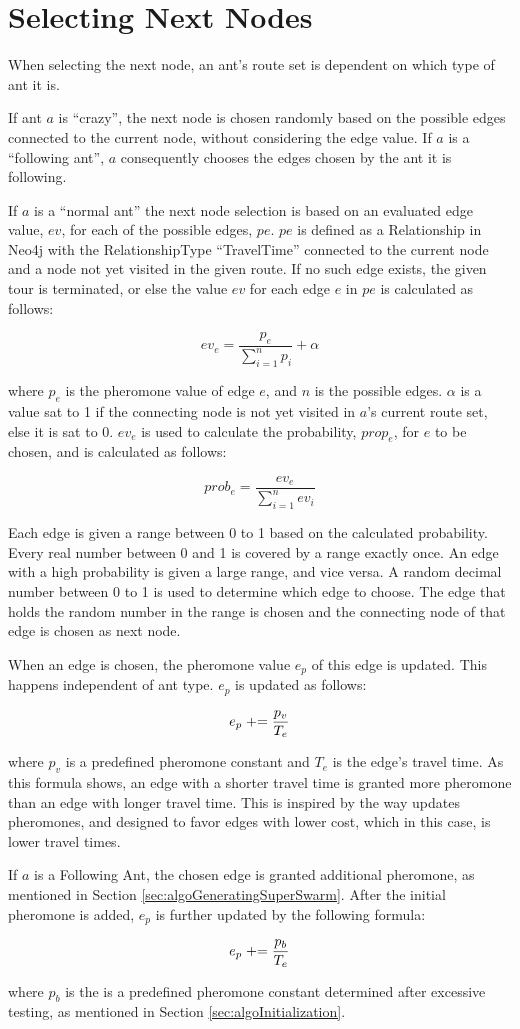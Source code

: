 \section{Selecting Next Nodes}
\label{sec:selectingNextNode}

When selecting the next node, an ant's route set is dependent on which type of ant it is. 

If ant $a$ is ``crazy'', the next node is chosen randomly based on the possible edges connected to the current node, without considering the edge value. If $a$ is a ``following ant'', $a$ consequently chooses the edges chosen by the ant it is following.  

If $a$ is a ``normal ant'' the next node selection is based on an evaluated edge value, $ev$, for each of the possible edges, $pe$. $pe$ is defined as a Relationship in Neo4j with the RelationshipType ``TravelTime'' connected to the current node and a node not yet visited in the given route. If no such edge exists, the given tour is terminated, or else the value $ev$ for each edge $e$ in $pe$ is calculated as follows: 

$$ev_e = \frac{p_e}{\sum\limits^{n}_{i=1}p_i} + \alpha $$

where $p_e$ is the pheromone value of edge $e$, and $n$ is the possible edges. $\alpha$ is a value sat to 1 if the connecting node is not yet visited in $a$'s current route set, else it is sat to 0.
$ev_e$ is used to calculate the probability, $prop_e$, for $e$ to be chosen, and is calculated as follows:

$$prob_e = \frac{ev_e}{\sum\limits^{n}_{i=1}ev_i}$$

Each edge is given a range between 0 to 1 based on the calculated probability. Every real number between 0 and 1 is covered by a range exactly once. An edge with a high probability is given a large range, and vice versa. A random decimal number between 0 to 1 is used to determine which edge to choose. The edge that holds the random number in the range is chosen and the connecting node of that edge is chosen as next node. 

When an edge is chosen, the pheromone value $e_p$ of this edge is updated. This happens independent of ant type. $e_p$ is updated as follows:

$$e_p \mathrel{+}= \frac{p_v}{T_e}$$ 

where $p_v$ is a predefined pheromone constant and $T_e$ is the edge's travel time. As this formula shows, an edge with a shorter travel time is granted more pheromone than an edge with longer travel time. This is inspired by the way \citet{hsiao04} updates pheromones, and designed to favor edges with lower cost, which in this case, is lower travel times. 

If $a$ is a Following Ant, the chosen edge is granted additional pheromone, as mentioned in Section \vref{sec:algoGeneratingSuperSwarm}. After the initial pheromone is added, $e_p$ is further updated by the following formula:

$$e_p \mathrel{+}= \frac{p_b}{T_e}$$ 

where $p_b$ is the is a predefined pheromone constant determined after excessive testing, as mentioned in Section \vref{sec:algoInitialization}. 

